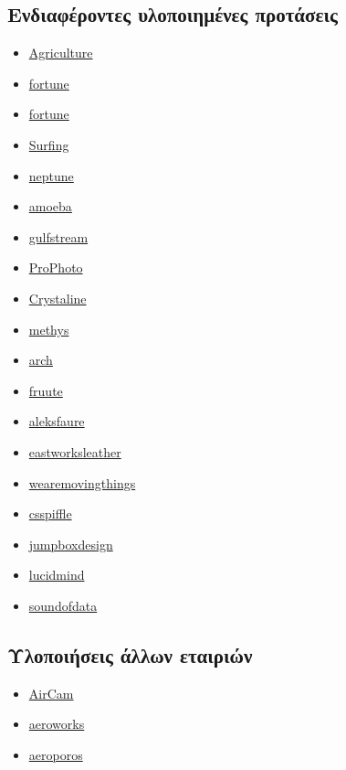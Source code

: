 \documentclass[a4paper, 12pt, twoside]{report}
\begin{document}
		\subsection{Ενδιαφέροντες υλοποιημένες προτάσεις}
			\begin{itemize}
				\item \href{http://www.templatemonster.com/demo/39989.html}{Agriculture}
				\item \href{http://www.templatemonster.com/demo/39987.html}{fortune}
				\item \href{http://www.templatemonster.com/demo/39985.html}{fortune}
				\item \href{http://www.templatemonster.com/demo/39988.html}{Surfing}
				\item \href{http://www.themeshark.com/demo/neptune/}{neptune}
				\item \href{http://www.themeshark.com/demo/amoeba/}{amoeba}
				\item \href{http://www.themeshark.com/demo/gulfstream/}{gulfstream}
				\item \href{http://switcher.sooperthemes.com/?theme=prophoto}{ProPhoto}
				\item \href{http://demo.rockettheme.com/drupal/?theme=crystalline}{Crystaline}
				\item \href{http://demo.themebrain.com/#methys_ii}{methys}
				\item \href{http://www.templatemonster.com/demo/39138.html}{arch}
				\item \href{http://www.fruute.com/}{fruute}
				\item \href{http://aleksfaure.com/}{aleksfaure}
				\item \href{http://www.eastworksleather.com/}{eastworksleather}
				\item \href{http://www.wearemovingthings.com/}{wearemovingthings}
				\item \href{http://pitch.csspiffle.com/}{csspiffle}
				\item \href{http://www.jumpboxdesign.co.uk/about.html}{jumpboxdesign}
				\item \href{http://www.lucidmind.net/index.php}{lucidmind}
				\item \href{http://soundofdata.nl/en/}{soundofdata}				
			\end{itemize}
			
		\subsection{Υλοποιήσεις άλλων εταιριών}
			\begin{itemize}
				\item \href{http://yes.aircam.gr/el/}{AirCam}
				\item \href{http://www.aeroworks.gr/}{aeroworks}
				\item \href{http://www.aeroporos.com}{aeroporos}
			\end{itemize}
		
	
	
	
		
		
		

	\cleardoublepage
	\label{κεφ.:Βιβλιογραφία}
	\printbibliography[title={Βιβλιογραφία}]
	
\end{document}

